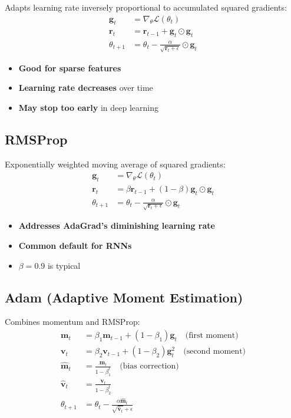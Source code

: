 Adapts learning rate inversely proportional to accumulated squared gradients:
\begin{align}
\mathbf{g}_t &= \nabla_\theta \mathcal{L}(\theta_t) \\
\mathbf{r}_t &= \mathbf{r}_{t-1} + \mathbf{g}_t \odot \mathbf{g}_t \\
\theta_{t+1} &= \theta_t - \frac{\alpha}{\sqrt{\mathbf{r}_t + \epsilon}} \odot \mathbf{g}_t
\end{align}

\begin{itemize}
    \item \textbf{Good for sparse features}
    \item \textbf{Learning rate decreases} over time
    \item \textbf{May stop too early} in deep learning
\end{itemize}

\subsection{RMSProp}

Exponentially weighted moving average of squared gradients:
\begin{align}
\mathbf{g}_t &= \nabla_\theta \mathcal{L}(\theta_t) \\
\mathbf{r}_t &= \beta \mathbf{r}_{t-1} + (1-\beta)\mathbf{g}_t \odot \mathbf{g}_t \\
\theta_{t+1} &= \theta_t - \frac{\alpha}{\sqrt{\mathbf{r}_t + \epsilon}} \odot \mathbf{g}_t
\end{align}

\begin{itemize}
    \item \textbf{Addresses AdaGrad's diminishing learning rate}
    \item \textbf{Common default for RNNs}
    \item $\beta = 0.9$ is typical
\end{itemize}

\subsection{Adam (Adaptive Moment Estimation)}

Combines momentum and RMSProp:
\begin{align}
\mathbf{m}_t &= \beta_1 \mathbf{m}_{t-1} + (1-\beta_1)\mathbf{g}_t \quad \text{(first moment)} \\
\mathbf{v}_t &= \beta_2 \mathbf{v}_{t-1} + (1-\beta_2)\mathbf{g}_t^2 \quad \text{(second moment)} \\
\hat{\mathbf{m}}_t &= \frac{\mathbf{m}_t}{1-\beta_1^t} \quad \text{(bias correction)} \\
\hat{\mathbf{v}}_t &= \frac{\mathbf{v}_t}{1-\beta_2^t} \\
\theta_{t+1} &= \theta_t - \frac{\alpha \hat{\mathbf{m}}_t}{\sqrt{\hat{\mathbf{v}}_t} + \epsilon}
\end{align}

